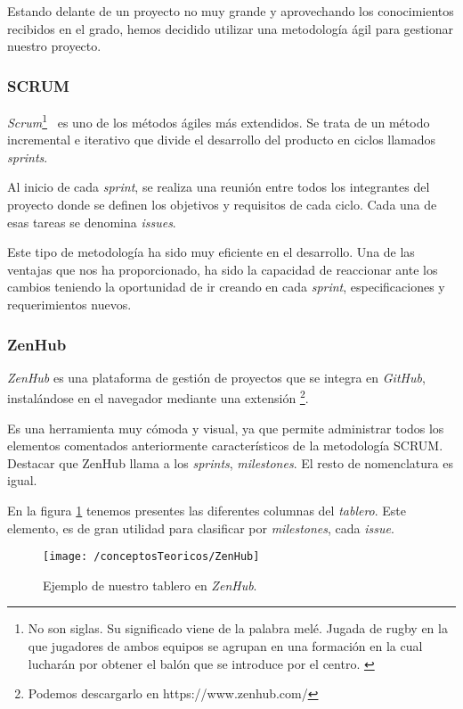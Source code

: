 Estando delante de un proyecto no muy grande y aprovechando los conocimientos recibidos en el grado, hemos decidido utilizar una metodología ágil para gestionar nuestro proyecto.

\subsubsection{SCRUM}

\textit{Scrum}\footnote{No son siglas. Su significado viene de la palabra melé. Jugada de rugby en la que jugadores de ambos equipos se agrupan en una formación en la cual lucharán por obtener el balón que se introduce por el centro. \cite{web:scrum_origen}}~\cite{web:scrum} es uno de los métodos ágiles más extendidos. Se trata de un método incremental e iterativo que divide el desarrollo del producto en ciclos llamados \textit{sprints}.

Al inicio de cada \textit{sprint}, se realiza una reunión entre todos los integrantes del proyecto donde se definen los objetivos y requisitos de cada ciclo. Cada una de esas tareas se denomina \textit{issues}.

Este tipo de metodología ha sido muy eficiente en el desarrollo. Una de las ventajas que nos ha proporcionado, ha sido la capacidad de reaccionar ante los cambios teniendo la oportunidad de ir creando en cada \textit{sprint}, especificaciones y requerimientos nuevos.

\subsubsection{ZenHub}

\textit{ZenHub} es una plataforma de gestión de proyectos que se integra en \textit{GitHub}, instalándose en el navegador mediante una extensión \footnote{Podemos descargarlo en https://www.zenhub.com/}.

Es una herramienta muy cómoda y visual, ya que permite administrar todos los elementos comentados anteriormente característicos de la metodología SCRUM. Destacar que ZenHub llama a los \textit{sprints}, \textit{milestones}. El resto de nomenclatura es igual.

En la figura \ref{fig:ZenHub} tenemos presentes las diferentes columnas del \textit{tablero}. Este elemento, es de gran utilidad para clasificar por \textit{milestones}, cada \textit{issue}.

\begin{figure}[ht]
	\centering
	\texttt{[image: /conceptosTeoricos/ZenHub]}
	\caption{Ejemplo de nuestro tablero en \textit{ZenHub}.}
	\label{fig:ZenHub}
\end{figure}

